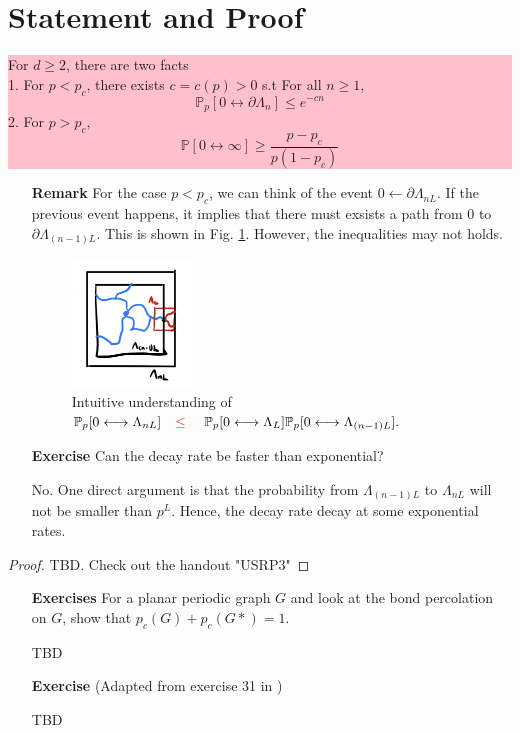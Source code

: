 \documentclass[12pt,a4paper]{report}
\theoremstyle{definition}
\newcommand{\SOL}{\fbox{ \tt s\parbox[b][2pt][c]{6pt}{o}\hspace*{-7pt} L:}}
\begin{document}
\section{Statement and Proof}
\colorbox{pink}{
	\begin{minipage}{1 \textwidth}
		For $d \geq 2$, there are two facts\\
		1. For $p < p_c$, there exists $c = c(p) > 0$ s.t
				For all $n\geq 1$, 
				$$
					\mathbb{P}_p[0 \longleftrightarrow \partial \Lambda_n] \leq e^{-cn}
				$$
		2. For $p > p_c$,
			$$
			\mathbb{P}[0\longleftrightarrow \infty ]\geq \frac{p-p_c}{p(1-p_c)}
			$$
	\end{minipage}
}
\begin{enumerate}
	\item[\textbf{Remark}] For the case $p < p_c$, we can think of the event $0 \longleftarrow \partial \Lambda_{nL}$. If the previous event happens, it implies that there must exsists a path from $0$ to $\partial \Lambda_{(n-1)L}$. This is shown in Fig. \ref{Exp1}. However, the inequalities may not holds.
	\begin{figure}[h]
		\centering
		\includegraphics[width = 0.3\textwidth]{picture/Exp1.png}
		\caption{\label{Exp1}Intuitive understanding of $ \mathbb{P}_p[0 \longleftrightarrow \Lambda_{nL}] \text{{\color{red} $\quad \leq \quad$ }} \mathbb{P}_p[0 \longleftrightarrow \Lambda_L]\mathbb{P}_p[0 \longleftrightarrow \Lambda_{(n-1)L}].$}
	\end{figure}
	\item[\textbf{Exercise}] Can the decay rate be faster than exponential?\\
	\item[\SOL] No. One direct argument is that the probability from $\Lambda_{(n-1)L}$	to $\Lambda_{nL}$ will not be smaller than $p^L$. Hence, the decay rate decay at some exponential rates.
\end{enumerate}
\begin{proof}
	TBD. Check out the handout "USRP3" 
\end{proof}
\begin{enumerate}
	\item[\textbf{Exercises}] For a planar periodic graph $G$ and look at the bond percolation on $G$, show that $p_c(G) + p_c(G*) = 1$.
	\item[\SOL] TBD
	\item[\textbf{Exercise}] (Adapted from exercise 31 in \cite{Copin18})
	\item[\SOL] TBD	
\end{enumerate}
\end{document}
